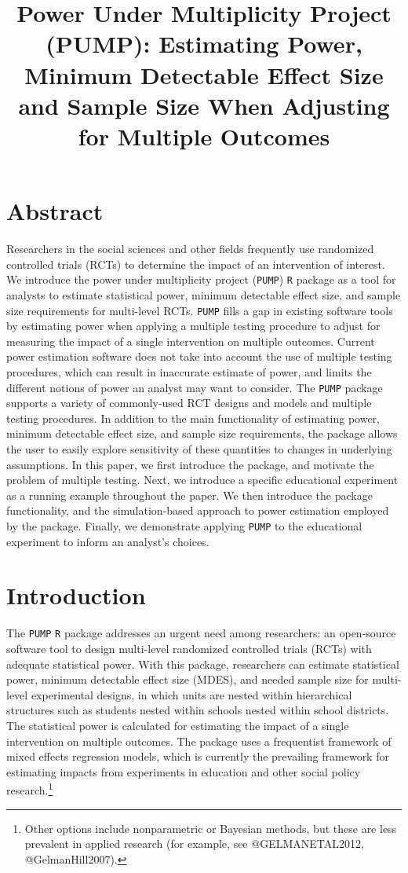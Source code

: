 \documentclass[
]{article}
\title{Power Under Multiplicity Project (PUMP): Estimating Power,
Minimum Detectable Effect Size and Sample Size When Adjusting for
Multiple Outcomes}
\author{}
\date{\vspace{-2.5em}}
\begin{document}
\maketitle

\section*{Abstract}

Researchers in the social sciences and other fields frequently use
randomized controlled trials (RCTs) to determine the impact of an
intervention of interest. We introduce the power under multiplicity
project (\texttt{PUMP}) \texttt{R} package as a tool for analysts to
estimate statistical power, minimum detectable effect size, and sample
size requirements for multi-level RCTs. \texttt{PUMP} fills a gap in
existing software tools by estimating power when applying a multiple
testing procedure to adjust for measuring the impact of a single
intervention on multiple outcomes. Current power estimation software
does not take into account the use of multiple testing procedures, which
can result in inaccurate estimate of power, and limits the different
notions of power an analyst may want to consider. The \texttt{PUMP}
package supports a variety of commonly-used RCT designs and models and
multiple testing procedures. In addition to the main functionality of
estimating power, minimum detectable effect size, and sample size
requirements, the package allows the user to easily explore sensitivity
of these quantities to changes in underlying assumptions. In this paper,
we first introduce the package, and motivate the problem of multiple
testing. Next, we introduce a specific educational experiment as a
running example throughout the paper. We then introduce the package
functionality, and the simulation-based approach to power estimation
employed by the package. Finally, we demonstrate applying \texttt{PUMP}
to the educational experiment to inform an analyst's choices.

\section{Introduction}
\label{sec:intro}

The \texttt{PUMP} \texttt{R} package addresses an urgent need among
researchers: an open-source software tool to design multi-level
randomized controlled trials (RCTs) with adequate statistical power.
With this package, researchers can estimate statistical power, minimum
detectable effect size (MDES), and needed sample size for multi-level
experimental designs, in which units are nested within hierarchical
structures such as students nested within schools nested within school
districts. The statistical power is calculated for estimating the impact
of a single intervention on multiple outcomes. The package uses a
frequentist framework of mixed effects regression models, which is
currently the prevailing framework for estimating impacts from
experiments in education and other social policy
research.\footnote{Other options include nonparametric or Bayesian methods, but these are less prevalent in applied research (for example, see @GELMANETAL2012, @GelmanHill2007).}
\end{document}
